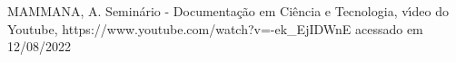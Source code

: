 \documentclass[
12pt,		%
openright,	%
twoside,  %
a4paper,			%
chapter=TITLE,		%
english,			%
french,				%
spanish,			%
brazil				%
]{USPSC-classe/USPSC}
\begin{document}
\begin{flushleft}
\begin{flushleft}
\begin{flushleft}
\begin{flushleft}
\begin{flushleft}
\begin{flushleft}
\begin{flushleft}
\begin{flushleft}
\begin{flushleft}
\begin{flushleft}
\begin{flushleft}
\begin{flushleft}
\begin{flushleft}
\begin{flushleft}
\begin{flushleft}
\begin{flushleft}
\begin{flushleft}
[MAMMANA, 2020] MAMMANA, A. Semin\'ario - Documenta\c{c}\~ao em Ci\^encia e Tecnologia, v\'{\i}deo do Youtube, https://www.youtube.com/watch?v=-ek\_EjIDWnE acessado em 12/08/2022
\end{flushleft}


\end{flushleft}


\end{flushleft}


\end{flushleft}


\end{flushleft}


\end{flushleft}


\end{flushleft}


\end{flushleft}


\end{flushleft}


\end{flushleft}


\end{flushleft}


\end{flushleft}


\end{flushleft}


\end{flushleft}


\end{flushleft}


\end{flushleft}


\end{flushleft}
\end{document}
